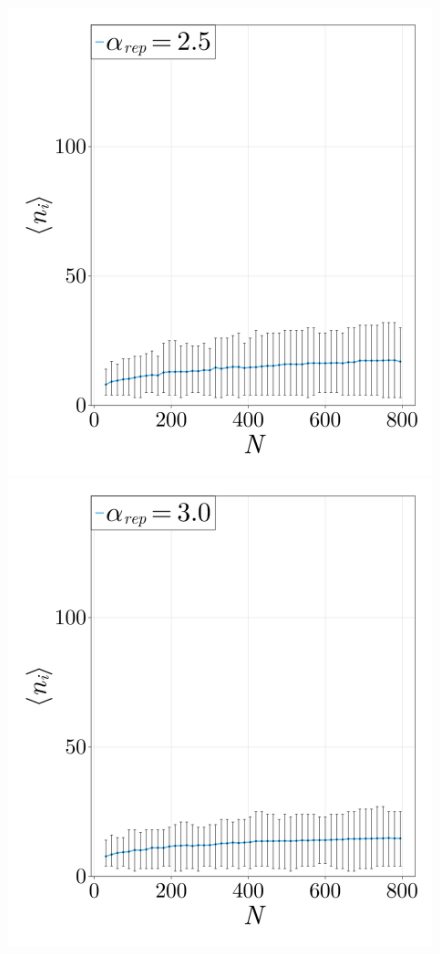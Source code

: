 \begin{figure}[p]
\begin{minipage}{0.49\textwidth}
    \end{minipage}
    \begin{minipage}{0.49\textwidth}
        \centering
        \includegraphics[width=\linewidth]{figures/303/303-reps-ni-2dot5.png} 
    \end{minipage}
    \begin{minipage}{0.49\textwidth}
        \centering
        \includegraphics[width=\linewidth]{figures/303/303-reps-ni-3.png} 
    \end{minipage}


\end{figure}
